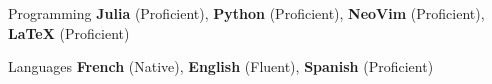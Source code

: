 

\begin{cvskills}

	\cvskill
	{Programming} %
	{\textbf{Julia} (Proficient), \textbf{Python} (Proficient), \textbf{NeoVim} (Proficient), \textbf{LaTeX} (Proficient)} %

	\cvskill
	{Languages} %
	{\textbf{French} (Native), \textbf{English} (Fluent), \textbf{Spanish} (Proficient)} %

\end{cvskills}
